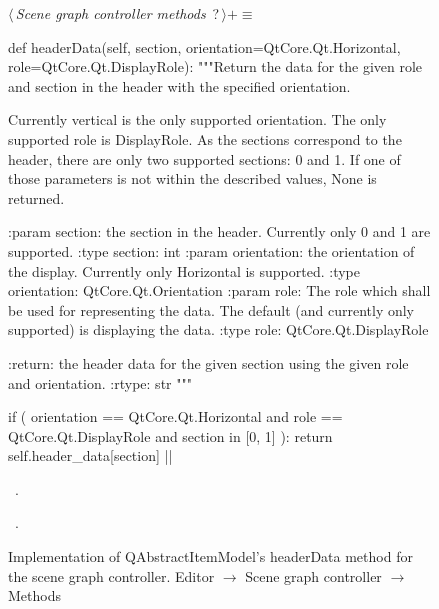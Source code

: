 \documentclass[%
    a4paper,    %
    justified,  %
    nobib,      %
    openany     %
]{tufte-book}
\begin{document}
\begin{figure}
\begin{flushleft} \small
\begin{minipage}{\linewidth}\label{scrap36}\raggedright\small
{} $\langle\,${\itshape Scene graph controller methods}\nobreak\ {\footnotesize {?}}$\,\rangle+\equiv$
\vspace{-1ex}
\begin{pythoncode}
def headerData(self, section, orientation=QtCore.Qt.Horizontal,
               role=QtCore.Qt.DisplayRole):
    """Return the data for the given role and section in the
    header with the specified orientation.

    Currently vertical is the only supported orientation. The
    only supported role is DisplayRole. As the sections correspond
    to the header, there are only two supported sections: 0 and 1.
    If one of those parameters is not within the described values,
    None is returned.

    :param section: the section in the header. Currently only 0
                    and 1 are supported.
    :type  section: int
    :param orientation: the orientation of the display. Currently
                        only Horizontal is supported.
    :type orientation:  QtCore.Qt.Orientation
    :param role: The role which shall be used for representing
                 the data. The default (and currently only
                supported) is displaying the data.
    :type role:  QtCore.Qt.DisplayRole

    :return: the header data for the given section using the
             given role and orientation.
    :rtype:  str
    """

    if (
            orientation == QtCore.Qt.Horizontal  and
            role        == QtCore.Qt.DisplayRole and
            section     in [0, 1]
    ):
        return self.header_data[section]
|\NWsep|
\end{pythoncode}
\vspace{1.5ex}
\footnotesize
\begin{list}{}{\setlength{\itemsep}{-\parsep}\setlength{\itemindent}{-\leftmargin}}
\item \NWtxtMacroDefBy\ .
\item \NWtxtMacroRefIn\ .

\item{}
\end{list}
\end{minipage}\vspace{4ex}
\end{flushleft}
\caption{Implementation of QAbstractItemModel's headerData method for the scene
  graph controller.
  \newline{}\newline{}Editor $\rightarrow$ Scene graph controller $\rightarrow$
  Methods}
\label{editor:lst:scene-graph-controller:methods:header-data}
\end{figure}
\end{document}
